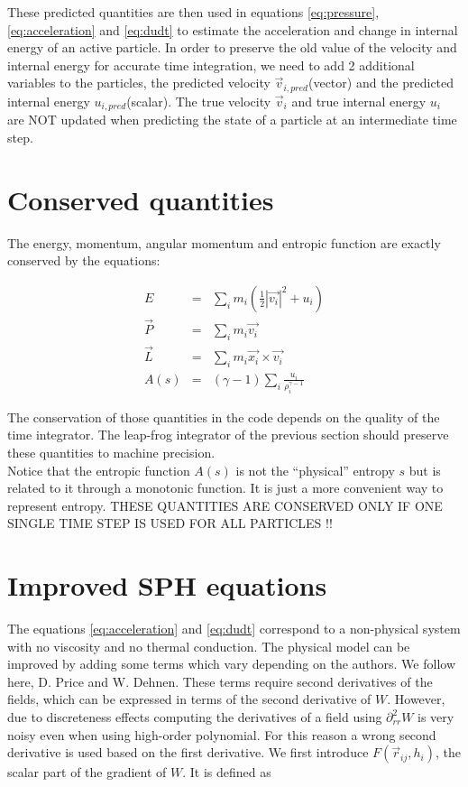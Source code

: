 \documentclass[a4paper,10pt]{article}
\begin{document}
These predicted quantities are then used in equations \ref{eq:pressure}, \ref{eq:acceleration} and \ref{eq:dudt} to
estimate the acceleration and change in internal energy of an active particle. In order to preserve the old value of
the velocity and internal energy for accurate time integration, we need to add 2 additional variables to the particles,
the predicted velocity $\vec{v}_{i,pred}$(vector) and the predicted internal energy $u_{i,pred}$(scalar). The true
velocity $\vec{v}_i$ and true internal energy $u_i$ are NOT updated when predicting the state of a particle at an
intermediate time step.


\section{Conserved quantities}

The energy, momentum, angular momentum and entropic function are exactly conserved by the equations:

\begin{eqnarray}
E &=&\sum_i m_i\left(\frac{1}{2}|\vec{v_i}|^2+u_i\right)\\
\vec{P} &=&\sum_i m_i \vec{v_i}\\
\vec{L} &=& \sum_i m_i \vec{x_i} \times \vec{v_i}\\ 
A(s) &=& \left(\gamma -1 \right)\sum_i \frac{u_i}{\rho_i^{\gamma - 1}}
\end{eqnarray}

The conservation of those quantities in the code depends on the quality of the time integrator. The leap-frog
integrator of the previous section should preserve these quantities to machine precision.\\
Notice that the entropic function $A(s)$ is not the ``physical'' entropy $s$ but is related to it through a monotonic
function. It is just a more convenient way to represent entropy.
THESE QUANTITIES ARE CONSERVED ONLY IF ONE SINGLE TIME STEP IS USED FOR ALL PARTICLES !!


\section{Improved SPH equations}

The equations \ref{eq:acceleration} and \ref{eq:dudt} correspond to a non-physical system with no viscosity and no
thermal conduction. The physical model can be improved by adding some terms which vary depending on the authors. We
follow here, D. Price and W. Dehnen.
These terms require second derivatives of the fields, which can be expressed in terms of the second derivative of $W$.
However, due to discreteness effects computing the derivatives of a field using $\partial^2_{rr}W$ is very noisy even
when using high-order polynomial. For this reason a wrong second derivative is used based on the first derivative. We
first introduce $F(\vec{r}_{ij},h_i)$, the scalar part of the gradient of $W$. It is defined as
\end{document}
